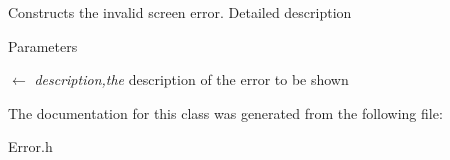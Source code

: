 Constructs the invalid screen error. Detailed description 
\begin{DoxyParams}{Parameters}
\item[\mbox{$\leftarrow$} {\em description,the}]description of the error to be shown \end{DoxyParams}


The documentation for this class was generated from the following file:\begin{DoxyCompactItemize}
\item 
Error.h\end{DoxyCompactItemize}
